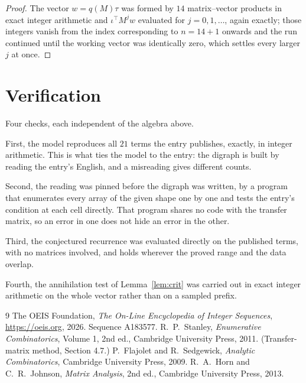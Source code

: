 \documentclass[11pt,a4paper]{article}
\theoremstyle{plain}
\theoremstyle{definition}
\begin{document}
\begin{proof}
The vector $w=q(M)\tau$ was formed by $14$ matrix--vector products in exact integer
arithmetic and $\iota^{\!\top}M^{j}w$ evaluated for $j=0,1,\dots$, again exactly; those
integers vanish from the index corresponding to $n=14+1$ onwards and the run continued
until the working vector was identically zero, which settles every larger $j$ at once.
\end{proof}

\section{Verification}

Four checks, each independent of the algebra above.

First, the model reproduces all $21$ terms the entry publishes, exactly, in integer
arithmetic. This is what ties the model to the entry: the digraph is built by reading the
entry's English, and a misreading gives different counts.

Second, the reading was pinned before the digraph was written, by a program that enumerates
every array of the given shape one by one and tests the entry's condition at each cell
directly. That program shares no code with the transfer matrix, so an error in one does not
hide an error in the other.

Third, the conjectured recurrence was evaluated directly on the published terms, with no
matrices involved, and holds wherever the proved range and the data overlap.

Fourth, the annihilation test of Lemma~\ref{lem:crit} was carried out in exact integer
arithmetic on the whole vector rather than on a sampled prefix.

\begin{thebibliography}{9}
 The OEIS Foundation, \emph{The On-Line Encyclopedia of Integer
Sequences}, \url{https://oeis.org}, 2026. Sequence A183577.
 R.~P.~Stanley, \emph{Enumerative Combinatorics}, Volume 1, 2nd ed.,
Cambridge University Press, 2011. (Transfer-matrix method, Section 4.7.)
 P.~Flajolet and R.~Sedgewick, \emph{Analytic Combinatorics}, Cambridge
University Press, 2009.
 R.~A.~Horn and C.~R.~Johnson, \emph{Matrix Analysis}, 2nd ed., Cambridge
University Press, 2013.
\end{thebibliography}
\end{document}
